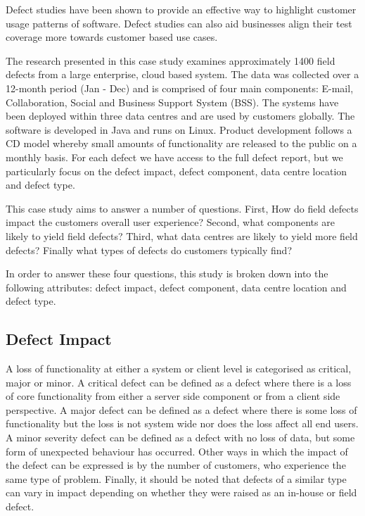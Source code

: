 Defect studies have been shown to provide an effective way to highlight customer usage patterns of software. Defect studies can also aid businesses align their test coverage more towards customer based use cases. \par
The research presented in this case study examines approximately 1400 field defects from a large enterprise, cloud based system. The data was collected over a 12-month period (Jan - Dec) and is comprised of four main components: E-mail, Collaboration, Social and Business Support System (BSS). The systems have been deployed within three data centres and are used by customers globally. The software is developed in Java and runs on Linux. Product development follows a CD model whereby small amounts of functionality are released to the public on a monthly basis.  For each defect we have access to the full defect report, but we particularly focus on the defect impact, defect component, data centre location and defect type. 

This case study aims to answer a number of questions. First, How do field defects impact the customers overall user experience? Second, what components are likely to yield field defects? Third, what data centres are likely to yield more field defects? Finally what types of defects do customers typically find?

In order to answer these four questions, this study is broken down into the following attributes: defect impact, defect component, data centre location and defect type.

\subsection{Defect Impact}

A loss of functionality at either a system or client level is categorised as critical, major or minor. A critical defect can be defined as a defect where there is a loss of core functionality from either a server side component or from a client side perspective. A major defect can be defined as a defect where there is some loss of functionality but the loss is not system wide nor does the loss affect all end users. A minor severity defect can be defined as a defect with no loss of data, but some form of unexpected behaviour has occurred.
Other ways in which the impact of the defect can be expressed is by the number of customers, who experience the same type of problem. Finally, it should be noted that defects of a similar type can vary in impact depending on whether they were raised as an in-house or field defect.

